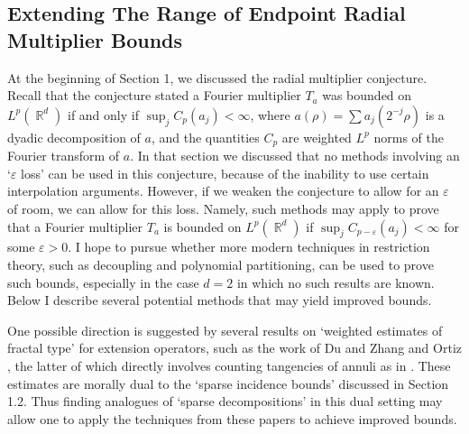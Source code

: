 \documentclass[11pt]{article}
\DeclareMathOperator{\RR}{\mathbb{R}}
\begin{document}



\subsection{Extending The Range of Endpoint Radial Multiplier Bounds}

At the beginning of Section 1, we discussed the radial multiplier conjecture. Recall that the conjecture stated a Fourier multiplier $T_a$ was bounded on $L^p(\RR^d)$ if and only if $\sup_j C_p(a_j) < \infty$, where $a(\rho) = \sum a_j(2^{-j} \rho)$ is a dyadic decomposition of $a$, and the quantities $C_p$ are weighted $L^p$ norms of the Fourier transform of $a$. In that section we discussed that no methods involving an `$\varepsilon$ loss' can be used in this conjecture, because of the inability to use certain interpolation arguments. However, if we weaken the conjecture to allow for an $\varepsilon$ of room, we can allow for this loss. Namely, such methods may apply to prove that a Fourier multiplier $T_a$ is bounded on $L^p(\RR^d)$ if $\sup_j C_{p - \varepsilon}(a_j) < \infty$ for some $\varepsilon > 0$. I hope to pursue whether more modern techniques in restriction theory, such as decoupling and polynomial partitioning, can be used to prove such bounds, especially in the case $d = 2$ in which no such results are known. Below I describe several potential methods that may yield improved bounds.

One possible direction is suggested by several results on `weighted estimates of fractal type' for extension operators, such as the work of Du and Zhang \cite{DuZhang} and Ortiz \cite{Ortiz}, the latter of which directly involves counting tangencies of annuli as in \cite{HeoNazarovSeeger}. These estimates are morally dual to the `sparse incidence bounds' discussed in Section 1.2. Thus finding analogues of `sparse decompositions' in this dual setting may allow one to apply the techniques from these papers to achieve improved bounds.
\end{document}
